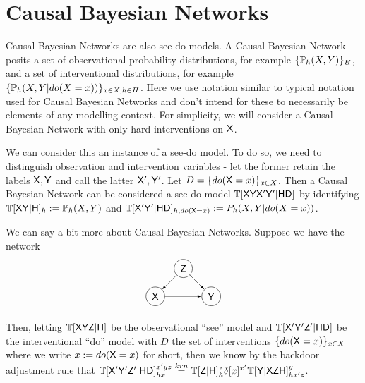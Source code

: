 

\section{Causal Bayesian Networks}

Causal Bayesian Networks are also see-do models. A Causal Bayesian Network posits a set of observational probability distributions, for example $\{\mathbb{P}_h(X,Y)\}_H$, and a set of interventional distributions, for example $\{\mathbb{P}_h(X,Y|do(X=x))\}_{x\in X,h\in H}$. Here we use notation similar to typical notation used for Causal Bayesian Networks and don't intend for these to necessarily be elements of any modelling context. For simplicity, we will consider a Causal Bayesian Network with only hard interventions on $\mathsf{X}$. 

We can consider this an instance of a see-do model. To do so, we need to distinguish observation and intervention variables - let the former retain the labels $\mathsf{X},\mathsf{Y}$ and call the latter $\mathsf{X}',\mathsf{Y}'$. Let $D=\{do(\mathsf{X}=x)\}_{x\in X}$. Then a Causal Bayesian Network can be considered a see-do model $\mathbb{T}[\mathsf{XYX'Y'}|\mathsf{HD}]$ by identifying $\mathbb{T}[\mathsf{XY}|\mathsf{H}]_h := \mathbb{P}_h(X,Y)$ and $\mathbb{T}[\mathsf{X'Y'}|\mathsf{HD}]_{h,do(\mathsf{X}=x)}:={P}_h(X,Y|do(X=x))$.


We can say a bit more about Causal Bayesian Networks. Suppose we have the network
\begin{align*}
\begin{tikzpicture}
    \path (0,0) node[draw,circle] (X) {$\RV{X}$}
    ++ (1,1) node[draw,circle] (Z) {$\RV{Z}$}
    ++ (1,-1) node[draw, circle] (Y) {$\RV{Y}$};
    \draw[-latex] (X)--(Y);
    \draw[-latex] (Z) -- (Y);
    \draw[-latex] (Z) -- (X);
\end{tikzpicture}
\end{align*}

Then, letting $\mathbb{T}[\mathsf{XYZ}|\mathsf{H}]$ be the observational ``see'' model and $\mathbb{T}[\mathsf{X'Y'Z'}|\mathsf{HD}]$ be the interventional ``do'' model with $D$ the set of interventions $\{do(\mathsf{X}=x)\}_{x\in X}$ where we write $x:=do(\mathsf{X}=x)$ for short, then we know by the backdoor adjustment rule that $\mathbb{T}[\mathsf{X'Y'Z'}|\mathsf{HD}]_{hx}^{x'yz} \overset{krn}{=} \mathbb{T}[\mathsf{Z}|\mathsf{H}]_h^z \delta[x]^{x'} \mathbb{T}[\mathsf{Y}|\mathsf{XZH}]_{hx'z}^y$. 

